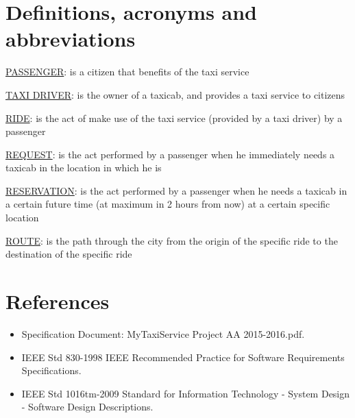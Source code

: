\section{Definitions, acronyms and abbreviations}
\begin{description}
	\item \underline{PASSENGER}: is a citizen that benefits of the taxi service
	\item \underline{TAXI DRIVER}: is the owner of a taxicab, and provides a taxi service to citizens
	\item \underline{RIDE}: is the act of make use of the taxi service (provided by a taxi driver) by a passenger
	\item \underline{REQUEST}: is the act performed by a passenger when he immediately needs a taxicab in the location in which he is 
	\item \underline{RESERVATION}: is the act performed by a passenger when he needs a taxicab in a certain future time (at maximum in 2 hours from now) at a certain specific location
	\item \underline{ROUTE}: is the path through the city from the origin of the specific ride to the destination of the specific ride
\end{description}

\section{References}
\begin{itemize}
	\item Specification Document: MyTaxiService Project AA 2015-2016.pdf.
	\item IEEE Std 830-1998 IEEE Recommended Practice for Software Requirements Specifications.
	\item IEEE Std 1016tm-2009 Standard for Information Technology - System Design - Software Design Descriptions.
\end{itemize}

